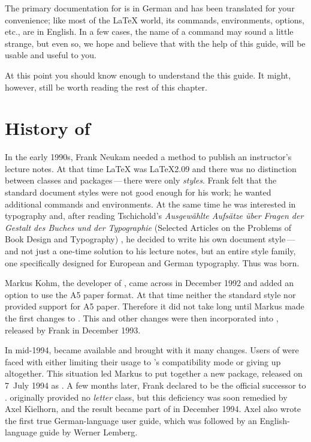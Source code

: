 \begin{Explain} 
  The primary documentation for {\KOMAScript} is in German and has been
  translated for your convenience; like most of the {\LaTeX} world, its
  commands, environments, options, etc., are in English. In a few cases, the
  name of a command may sound a little strange, but even so, we hope and
  believe that with the help of this guide, {\KOMAScript} will be usable
  and useful to you.
\end{Explain}

At this point you should know enough to understand the this guide.
It might, however, still be worth reading the rest of this chapter.

\section{History of {\KOMAScript}}

In the early 1990s, Frank Neukam needed a method to publish an instructor's
lecture notes. At that time {\LaTeX} was {\LaTeX}2.09 and there was no
distinction between classes and packages\,---\,there were only \emph{styles}.
Frank felt that the standard document styles were not good enough for his
work; he wanted additional commands and environments. At the same time he was
interested in typography and, after reading Tschichold's \emph{Ausgew\"ahlte
  Aufs\"atze \"uber Fragen der Gestalt des Buches und der Typographie}
(Selected Articles on the Problems of Book Design and Typography)
\cite{JTsch87}, he decided to write his own document style\,---\,and not just
a one-time solution to his lecture notes, but an entire style family, one
specifically designed for European and German typography. Thus {\Script} was
born.

Markus Kohm, the developer of {\KOMAScript}, came across {\Script} in December
1992 and added an option to use the A5 paper format. At that time neither the
standard style nor {\Script} provided support for A5 paper. Therefore it did
not take long until Markus made the first changes to {\Script}. This and other
changes were then incorporated into {\ScriptII}, released by Frank in December
1993.

In mid-1994, {\LaTeXe} became available and brought with it many changes.
Users of {\ScriptII} were faced with either limiting their usage to
{\LaTeXe}'s compatibility mode or giving up {\Script} altogether.  This
situation led Markus to put together a new {\LaTeXe} package, released on
7~July 1994 as {\KOMAScript}. A few months later, Frank declared {\KOMAScript}
to be the official successor to {\Script}. {\KOMAScript} originally provided
no \emph{letter} class, but this deficiency was soon remedied by Axel
Kielhorn, and the result became part of {\KOMAScript} in December 1994.  Axel
also wrote the first true German-language user guide, which was followed by an
English-language guide by Werner Lemberg.

